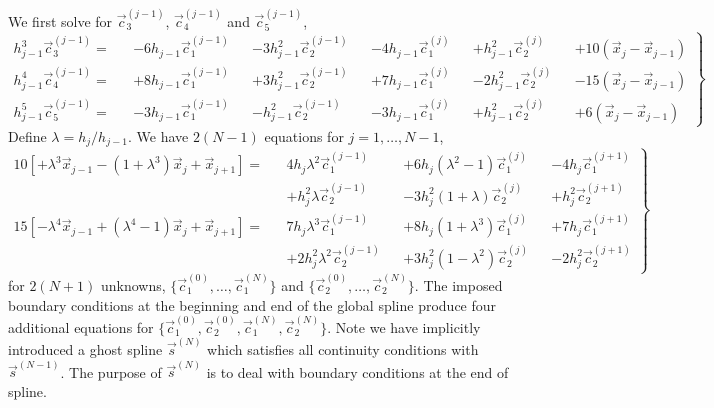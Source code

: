 \documentclass{jfm}
\begin{document}
We first solve for $\vec{c}^{(j-1)}_3$, $\vec{c}^{(j-1)}_4$ and $\vec{c}^{(j-1)}_5$,
\begin{equation}\label{eq:spline_c3c4c5}\left.
\begin{aligned}
h^3_{j-1}\vec{c}^{(j-1)}_3=
&&-6 h_{j-1} \vec{c}_1^{(j-1)}
&&-3 h_{j-1}^2 \vec{c}_2^{(j-1)}
&&-4 h_{j-1} \vec{c}_1^{(j)}
&&+h_{j-1}^2 \vec{c}_2^{(j)}
&&+10( \vec{x}_j- \vec{x}_{j-1})\\
h^4_{j-1}\vec{c}^{(j-1)}_4=
&&+8 h_{j-1} \vec{c}_1^{(j-1)}
&&+3 h_{j-1}^2 \vec{c}_2^{(j-1)}
&&+7 h_{j-1} \vec{c}_1^{(j)}
&&-2 h_{j-1}^2 \vec{c}_2^{(j)}
&&-15 (\vec{x}_j- \vec{x}_{j-1})\\
h^5_{j-1}\vec{c}^{(j-1)}_5=
&&-3 h_{j-1} \vec{c}_1^{(j-1)}
&&-h_{j-1}^2 \vec{c}_2^{(j-1)}
&&-3 h_{j-1} \vec{c}_1^{(j)}
&&+h_{j-1}^2 \vec{c}_2^{(j)}
&&+6( \vec{x}_j- \vec{x}_{j-1})
\end{aligned}\right\}
\end{equation}
Define $\lambda=h_j/h_{j-1}$. We have $2(N-1)$ equations for $j=1,\dots, N-1$,
\begin{equation}\label{eq:spline_mid}
\left.\begin{aligned}
10\left[+ \lambda^3 \vec{x}_{j-1}- (1+\lambda^3) \vec{x}_j+\vec{x}_{j+1}\right]=
&&4 h_{j} \lambda^2 \vec{c}_1^{(j-1)}
&&+6 h_{j} (\lambda^2-1) \vec{c}_1^{(j)}
&&-4 h_{j} \vec{c}_1^{(j+1)}\\
&&+h_{j}^2 \lambda \vec{c}_2^{(j-1)}
&&-3 h_{j}^2 (1+\lambda) \vec{c}_2^{(j)}
&&+h_{j}^2 \vec{c}_2^{(j+1)}
\\
15 \left[- \lambda^4 \vec{x}_{j-1}+ (\lambda^4-1) \vec{x}_j+\vec{x}_{j+1}\right]=
&&7 h_{j} \lambda^3 \vec{c}_1^{(j-1)}
&&+8 h_{j} (1+\lambda^3) \vec{c}_1^{(j)}
&&+7 h_{j} \vec{c}_1^{(j+1)}\\
&&+2 h_{j}^2 \lambda^2 \vec{c}_2^{(j-1)}
&&+3h_{j}^2 (1- \lambda^2) \vec{c}_2^{(j)}
&&-2 h_{j}^2 \vec{c}_2^{(j+1)}
\end{aligned}\right\}
\end{equation}
for $2(N+1)$ unknowns,
 $\{\vec{c}_1^{(0)},\dots,\vec{c}_1^{(N)}\}$ and  $\{\vec{c}_2^{(0)},\dots,\vec{c}_2^{(N)}\}$.
The imposed boundary conditions at the beginning and end of the global spline
produce four additional equations for
$\{\vec{c}_1^{(0)}, \vec{c}_2^{(0)},\vec{c}_1^{(N)}, \vec{c}_2^{(N)}\}$.
Note we have implicitly introduced a ghost spline $\vec{s}^{(N)}$
which satisfies all continuity conditions with $\vec{s}^{(N-1)}$.
The purpose of $\vec{s}^{(N)}$ is to deal with boundary conditions at the end of spline.
\end{document}
